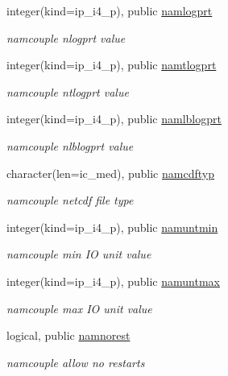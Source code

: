 \begin{DoxyCompactItemize}
integer(kind=ip\+\_\+i4\+\_\+p), public \hyperlink{namespacemod__oasis__namcouple_a46affda5336f60a1eeb1badaaccd3cfd}{namlogprt}
\begin{DoxyCompactList}\small\item\em namcouple nlogprt value \end{DoxyCompactList}\item 
integer(kind=ip\+\_\+i4\+\_\+p), public \hyperlink{namespacemod__oasis__namcouple_a45fbbd2941f5d71991d409f63e31cf02}{namtlogprt}
\begin{DoxyCompactList}\small\item\em namcouple ntlogprt value \end{DoxyCompactList}\item 
integer(kind=ip\+\_\+i4\+\_\+p), public \hyperlink{namespacemod__oasis__namcouple_ac2f9ee614d937824f48d80313f878d31}{namlblogprt}
\begin{DoxyCompactList}\small\item\em namcouple nlblogprt value \end{DoxyCompactList}\item 
character(len=ic\+\_\+med), public \hyperlink{namespacemod__oasis__namcouple_a6fc58f1e9018344a1d5f99e6767d1bda}{namcdftyp}
\begin{DoxyCompactList}\small\item\em namcouple netcdf file type \end{DoxyCompactList}\item 
integer(kind=ip\+\_\+i4\+\_\+p), public \hyperlink{namespacemod__oasis__namcouple_a1b8c7ce28c62fa0b15076b7169d8b454}{namuntmin}
\begin{DoxyCompactList}\small\item\em namcouple min IO unit value \end{DoxyCompactList}\item 
integer(kind=ip\+\_\+i4\+\_\+p), public \hyperlink{namespacemod__oasis__namcouple_ae750107f9401fd3c7348088ad3095b45}{namuntmax}
\begin{DoxyCompactList}\small\item\em namcouple max IO unit value \end{DoxyCompactList}\item 
logical, public \hyperlink{namespacemod__oasis__namcouple_ad1bd3ea485ad5f5114eb4b7f8c831ccb}{namnorest}
\begin{DoxyCompactList}\small\item\em namcouple allow no restarts \end{DoxyCompactList}\item 

\end{DoxyCompactItemize}
